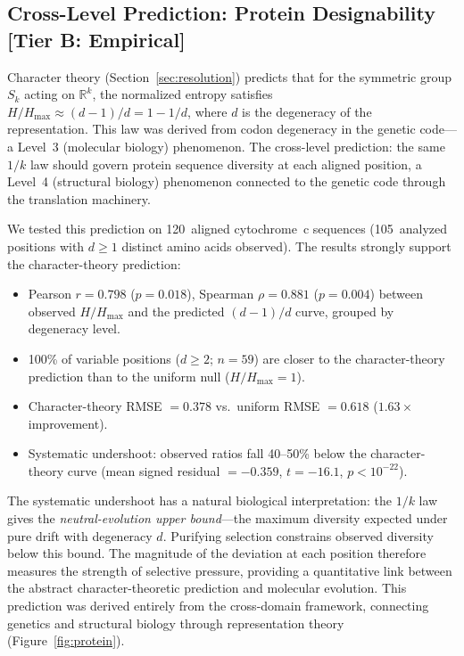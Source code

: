 \documentclass[11pt,a4paper]{article}
\begin{document}
\subsection{Cross-Level Prediction: Protein Designability\,\textnormal{\normalsize[Tier B: Empirical]}}
\label{sec:protein}

Character theory (Section~\ref{sec:resolution}) predicts that for the symmetric
group $S_k$ acting on $\mathbb{R}^k$, the normalized entropy satisfies
$H / H_{\max} \approx (d - 1)/d = 1 - 1/d$, where $d$ is the degeneracy of
the representation.  This law was derived from codon degeneracy in the genetic
code---a Level~3 (molecular biology) phenomenon.  The cross-level prediction:
the same $1/k$ law should govern protein sequence diversity at each aligned
position, a Level~4 (structural biology) phenomenon connected to the genetic
code through the translation machinery.

We tested this prediction on 120~aligned cytochrome~c sequences
(105~analyzed positions with $d \geq 1$ distinct amino acids observed).
The results strongly support the character-theory prediction:

\begin{itemize}
  \item Pearson $r = 0.798$ ($p = 0.018$), Spearman $\rho = 0.881$
        ($p = 0.004$) between observed $H/H_{\max}$ and the predicted
        $(d-1)/d$ curve, grouped by degeneracy level.
  \item 100\% of variable positions ($d \geq 2$; $n = 59$) are closer to the
        character-theory prediction than to the uniform null ($H/H_{\max} = 1$).
  \item Character-theory RMSE $= 0.378$ vs.\ uniform RMSE $= 0.618$
        ($1.63\times$ improvement).
  \item Systematic undershoot: observed ratios fall 40--50\% below the
        character-theory curve (mean signed residual $= -0.359$,
        $t = -16.1$, $p < 10^{-22}$).
\end{itemize}

The systematic undershoot has a natural biological interpretation: the $1/k$
law gives the \emph{neutral-evolution upper bound}---the maximum diversity
expected under pure drift with degeneracy $d$.  Purifying selection constrains
observed diversity below this bound.  The magnitude of the deviation at each
position therefore measures the strength of selective pressure, providing a
quantitative link between the abstract character-theoretic prediction and
molecular evolution.  This prediction was derived entirely from the
cross-domain framework, connecting genetics and structural biology through
representation theory (Figure~\ref{fig:protein}).
\end{document}
